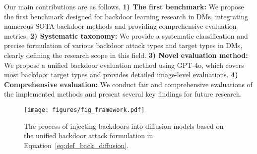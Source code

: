 Our main contributions are as follows. 
\textbf{1) The first benchmark:} We propose the first benchmark designed for backdoor learning research in DMs, integrating numerous SOTA backdoor methods and providing comprehensive evaluation metrics. 
\textbf{2) Systematic taxonomy:} We provide a systematic classification and precise formulation of various backdoor attack types and target types in DMs, clearly defining the research scope in this field.
\textbf{3) Novel evaluation method:} We propose a unified backdoor evaluation method using GPT-4o, which covers most backdoor target types and provides detailed image-level evaluations. 
\textbf{4) Comprehensive evaluation:} We conduct fair and comprehensive evaluations of the implemented methods and present several key findings for future research. 


\begin{figure*}
    \centering
    \texttt{[image: figures/fig\_framework.pdf]}
    \caption{The process of injecting backdoors into diffusion models based on the unified backdoor attack formulation in Equation~\eqref{eq:def_back_diffusion}.}
    \label{fig:framework}
\end{figure*}